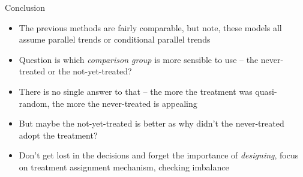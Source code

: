 \documentclass{beamer}
\begin{document}
\begin{frame}{Conclusion}

\begin{itemize}

\item The previous methods are fairly comparable, but note, these models all assume parallel trends or conditional parallel trends
\item Question is which \emph{comparison group} is more sensible to use -- the never-treated or the not-yet-treated?
\item There is no single answer to that -- the more the treatment was quasi-random, the more the never-treated is appealing
\item But maybe the not-yet-treated is better as why didn't the never-treated adopt the treatment?  
\item Don't get lost in the decisions and forget the importance of \emph{designing}, focus on treatment assignment mechanism, checking imbalance

\end{itemize}

\end{frame}
\end{document}
